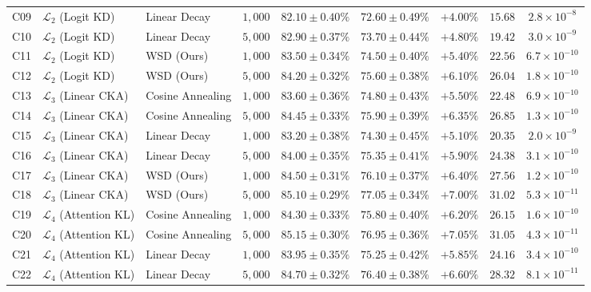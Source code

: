 \begin{table}[t]
{\begin{tabular}{@{} c l l c c c c c c @{}}
C09 & $\mathcal{L}_2$ (Logit KD) & Linear Decay    & $1{,}000$ & $82.10 \pm 0.40\%$ & $72.60 \pm 0.49\%$ & $+4.00\%$ & $15.68$ & $2.8 \times 10^{-8}$ \\
C10 & $\mathcal{L}_2$ (Logit KD) & Linear Decay    & $5{,}000$ & $82.90 \pm 0.37\%$ & $73.70 \pm 0.44\%$ & $+4.80\%$ & $19.42$ & $3.0 \times 10^{-9}$ \\
C11 & $\mathcal{L}_2$ (Logit KD) & WSD (Ours)      & $1{,}000$ & $83.50 \pm 0.34\%$ & $74.50 \pm 0.40\%$ & $+5.40\%$ & $22.56$ & $6.7 \times 10^{-10}$ \\
C12 & $\mathcal{L}_2$ (Logit KD) & WSD (Ours)      & $5{,}000$ & $84.20 \pm 0.32\%$ & $75.60 \pm 0.38\%$ & $+6.10\%$ & $26.04$ & $1.8 \times 10^{-10}$ \\
\midrule
C13 & $\mathcal{L}_3$ (Linear CKA) & Cosine Annealing & $1{,}000$ & $83.60 \pm 0.36\%$ & $74.80 \pm 0.43\%$ & $+5.50\%$ & $22.48$ & $6.9 \times 10^{-10}$ \\
C14 & $\mathcal{L}_3$ (Linear CKA) & Cosine Annealing & $5{,}000$ & $84.45 \pm 0.33\%$ & $75.90 \pm 0.39\%$ & $+6.35\%$ & $26.85$ & $1.3 \times 10^{-10}$ \\
C15 & $\mathcal{L}_3$ (Linear CKA) & Linear Decay    & $1{,}000$ & $83.20 \pm 0.38\%$ & $74.30 \pm 0.45\%$ & $+5.10\%$ & $20.35$ & $2.0 \times 10^{-9}$ \\
C16 & $\mathcal{L}_3$ (Linear CKA) & Linear Decay    & $5{,}000$ & $84.00 \pm 0.35\%$ & $75.35 \pm 0.41\%$ & $+5.90\%$ & $24.38$ & $3.1 \times 10^{-10}$ \\
C17 & $\mathcal{L}_3$ (Linear CKA) & WSD (Ours)      & $1{,}000$ & $84.50 \pm 0.31\%$ & $76.10 \pm 0.37\%$ & $+6.40\%$ & $27.56$ & $1.2 \times 10^{-10}$ \\
C18 & $\mathcal{L}_3$ (Linear CKA) & WSD (Ours)      & $5{,}000$ & $85.10 \pm 0.29\%$ & $77.05 \pm 0.34\%$ & $+7.00\%$ & $31.02$ & $5.3 \times 10^{-11}$ \\
\midrule
C19 & $\mathcal{L}_4$ (Attention KL) & Cosine Annealing & $1{,}000$ & $84.30 \pm 0.33\%$ & $75.80 \pm 0.40\%$ & $+6.20\%$ & $26.15$ & $1.6 \times 10^{-10}$ \\
C20 & $\mathcal{L}_4$ (Attention KL) & Cosine Annealing & $5{,}000$ & $85.15 \pm 0.30\%$ & $76.95 \pm 0.36\%$ & $+7.05\%$ & $31.05$ & $4.3 \times 10^{-11}$ \\
C21 & $\mathcal{L}_4$ (Attention KL) & Linear Decay    & $1{,}000$ & $83.95 \pm 0.35\%$ & $75.25 \pm 0.42\%$ & $+5.85\%$ & $24.16$ & $3.4 \times 10^{-10}$ \\
C22 & $\mathcal{L}_4$ (Attention KL) & Linear Decay    & $5{,}000$ & $84.70 \pm 0.32\%$ & $76.40 \pm 0.38\%$ & $+6.60\%$ & $28.32$ & $8.1 \times 10^{-11}$ \\

\end{tabular}}
\end{table}
